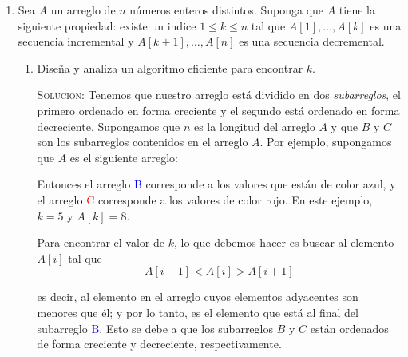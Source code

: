 \documentclass[letterpaper,11pt]{article}
\begin{document}
\begin{enumerate}
    \item Sea $A$ un arreglo de $n$ números enteros distintos. Suponga que $A$ 
    tiene la siguiente propiedad: existe un indice $1 \leq k \leq n$ tal que
    $A[1], \dots, A[k]$ es una secuencia incremental y 
    \mbox{$A[k+1], \dots, A[n]$} es una secuencia decremental. 

    \begin{enumerate}
		\item Diseña y analiza un algoritmo eficiente para encontrar $k$.
        
        \textsc{Solución:} Tenemos que nuestro arreglo está dividido en dos 
        \textit{subarreglos}, el primero ordenado en forma creciente y el 
        segundo está ordenado en forma decreciente. Supongamos que $n$ es la
        longitud del arreglo $A$ y que $B$ y $C$ son los subarreglos contenidos
        en el arreglo $A$. Por ejemplo, supongamos que $A$ es el siguiente 
        arreglo:
        \begin{center}
        \end{center}

        Entonces el arreglo \textcolor{blue}{B} corresponde a los valores que 
        están de color azul, y el arreglo \textcolor{red}{C} corresponde a los
        valores de color rojo. En este ejemplo, $k = 5$ y $A[k] = 8$.

        Para encontrar el valor de $k$, lo que debemos hacer es buscar al 
        elemento $A[i]$ tal que
        \begin{equation}
            \label{eq: ej6-1}
            A[i-1] < A[i] > A[i+1]
        \end{equation} 
        
        es decir, al elemento en el arreglo cuyos elementos adyacentes son 
        menores que él; y por lo tanto, es el elemento que está al final del 
        subarreglo \textcolor{blue}{B}. Esto se debe a que los subarreglos $B$ y 
        $C$ están ordenados de forma creciente y decreciente, respectivamente. 
        

\end{enumerate}
\end{enumerate}
\end{document}
